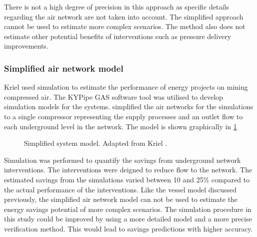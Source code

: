 There is not a high degree of precision in this approach as specific details regarding the air network are not taken into account. The simplified approach cannot be used to estimate more complex scenarios. The method also does not estimate other potential benefits of interventions such as pressure delivery improvements.

\subsubsection{Simplified air network model}
Kriel \cite{Kriel2014Masters} used simulation to estimate the performance of energy projects on mining compressed air. The KYPipe GAS software tool was utilised to develop simulation models for the systems. \cite{Kriel2014Masters} simplified the air networks for the simulations to a single compressor representing the supply processes and an outlet flow to each underground level in the network. The model is shown graphically in \cref{fig:kriel model}
\begin{figure}[h!]
	\centering
	\caption[Simplified system model.]{Simplified system model. Adapted from Kriel \cite{Kriel2014Masters}.}
	\label{fig:kriel model}
\end{figure}
\par 
Simulation was performed to quantify the savings from underground network interventions. The interventions were deigned to reduce flow to the network. The estimated savings from the simulations varied between 10 and 25\% compared to the actual performance of the interventions. Like the vessel model discussed previously, the simplified air network model can not be used to estimate the energy savings potential of more complex scenarios. The simulation procedure in this study could be improved by using a more detailed model and a more precise verification method. This would lead to savings predictions with higher accuracy. 

